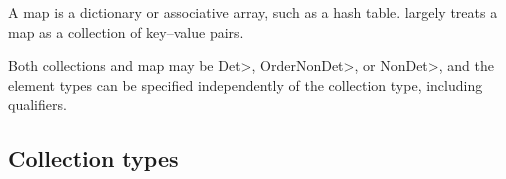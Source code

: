 A map is a dictionary or associative array, such as a hash table.
\OurTypeSystem largely treats a map as a collection of key--value pairs.

Both collections and map may be \<Det>, \<OrderNonDet>, or \<NonDet>, and
the element types can be specified independently of the collection type,
including qualifiers.



\subsection{Collection types}\label{collection-rules}


